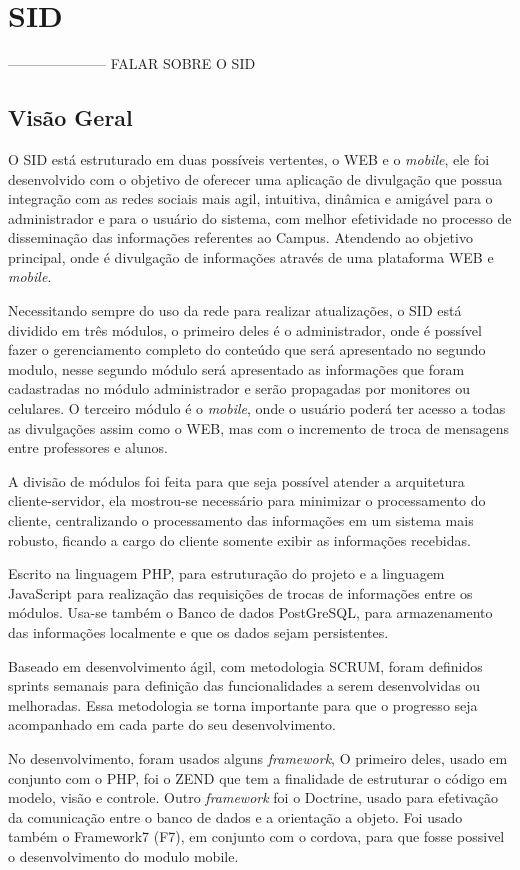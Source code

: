 \chapter[SID]{SID}
--------------------- FALAR SOBRE O SID

\section{Visão Geral}
O SID está estruturado em duas possíveis vertentes, o WEB e o \textit{mobile}, ele foi desenvolvido com o objetivo de oferecer uma aplicação de divulgação que possua integração com as redes sociais mais agil, intuitiva, dinâmica e amigável para o administrador e para o usuário do sistema, com melhor efetividade no processo de disseminação das informações referentes ao Campus. Atendendo ao objetivo principal, onde é divulgação de informações através de uma plataforma WEB e \textit{mobile}.

Necessitando sempre do uso da rede para realizar atualizações, o SID está dividido em três módulos, o primeiro deles é o administrador, onde é possível fazer o gerenciamento completo do conteúdo que será apresentado no segundo modulo, nesse segundo módulo será apresentado as informações que foram cadastradas no módulo
administrador e serão propagadas por monitores ou celulares. O terceiro módulo é o \textit{mobile}, onde o usuário poderá ter acesso a todas as divulgações assim como o WEB, mas com o incremento de troca de mensagens entre professores e alunos. 

A divisão de módulos foi feita para que seja possível atender a arquitetura cliente-servidor, ela mostrou-se necessário para minimizar o processamento do cliente, centralizando o processamento das informações em um sistema mais robusto, ficando a cargo do cliente somente exibir as informações recebidas.

Escrito na linguagem PHP, para estruturação do projeto e a linguagem JavaScript para realização das requisições de trocas de informações entre os módulos. Usa-se também o Banco de dados PostGreSQL, para armazenamento das informações localmente e que os dados sejam persistentes.

Baseado em desenvolvimento ágil, com metodologia SCRUM, foram definidos sprints semanais para definição das funcionalidades a serem desenvolvidas ou melhoradas. Essa metodologia se torna importante para que o progresso seja acompanhado em cada parte do seu desenvolvimento.

No desenvolvimento, foram usados alguns \textit{framework}, O primeiro deles, usado em conjunto com o PHP, foi o ZEND que tem a finalidade de estruturar o código em modelo, visão e controle. Outro \textit{framework} foi o Doctrine, usado para efetivação da comunicação entre o banco de dados e a orientação a objeto. Foi usado também o Framework7 (F7), em conjunto com o cordova, para que fosse possivel o desenvolvimento do modulo mobile.  


